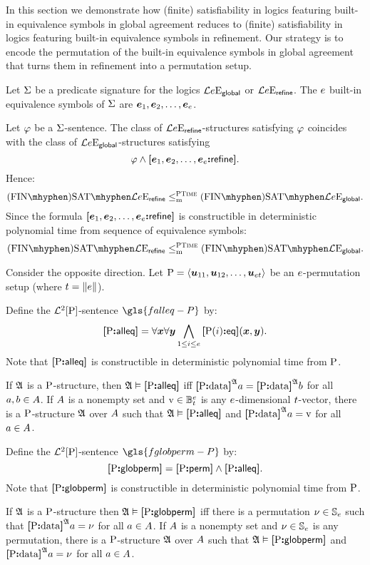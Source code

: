 
In this section we demonstrate how (finite) satisfiability in logics featuring
built-in equivalence symbols in global agreement reduces to (finite)
satisfiability in logics featuring built-in equivalence symbols in refinement.
Our strategy is to encode the permutation of the built-in equivalence symbols in
global agreement that turns them in refinement into a permutation setup.

Let $\mathrm{\Sigma}$ be a predicate signature for the logics $\mathcal{L}{e}\mathrm{E}_{\mathsf{global}}$
or $\mathcal{L}{e}\mathrm{E}_{\mathsf{refine}}$.
The $e$ built-in equivalence symbols of $\mathrm{\Sigma}$ are $\bm{e}_{1}, \bm{e}_{2}, \dots,
\bm{e}_{e}$.

Let $\varphi$ be a $\mathrm{\Sigma}$-sentence.
The class of $\mathcal{L}{e}\mathrm{E}_{\mathsf{refine}}$-structures satisfying $\varphi$
coincides with the class of $\mathcal{L}{e}\mathrm{E}_{\mathsf{global}}$-structures satisfying
\[
  \varphi \land {\bm{[}\bm{e}_{1},\bm{e}_{2},\dots,\bm{e}_{e}\mathord{\bm{:}}\mathsf{refine}\bm{]}}.
\]
Hence:
\[
  \FinASat{\Fo\Eea\sze\agrefine} \red\cP
  \FinASat{\Fo\Eea\sze\agglobal}.
\]
Since the formula ${\bm{[}\bm{e}_{1},\bm{e}_{2},\dots,\bm{e}_{e}\mathord{\bm{:}}\mathsf{refine}\bm{]}}$ is constructible in
deterministic polynomial time from sequence of equivalence symbols:
\[
  \FinASat{\Fo\Eea\nosze\agrefine} \red\cP
  \FinASat{\Fo\Eea\nosze\agglobal}.
\]

Consider the opposite direction.
Let ${\mathrm{P}} = \left\langle \bm{u}_{11}, \bm{u}_{12}, \dots, \bm{u}_{et} \right\rangle$ be an
$e$-permutation setup (where $t = \|e\|$).
\begin{definition}
Define the $\mathcal{L}^{2}[{\mathrm{P}}]$-sentence $\gls{falleq-P}$ by:
\[
  {\bm{[}{\mathrm{P}}\mathord{\bm{:}}\mathsf{alleq}\bm{]}} = \forall\bm{x} \forall\bm{y} \bigwedge_{1 \leq i \leq e}
  {\bm{[}{\mathrm{P}}(i)\mathord{\bm{:}}\mathsf{eq}\bm{]}}(\bm{x},\bm{y}).
\]
Note that ${\bm{[}{\mathrm{P}}\mathord{\bm{:}}\mathsf{alleq}\bm{]}}$ is constructible in deterministic polynomial time from
${\mathrm{P}}$.
\end{definition}
\begin{remark}
If $\mathfrak{A}$ is a ${\mathrm{P}}$-structure, then $\mathfrak{A} \vDash {\bm{[}{\mathrm{P}}\mathord{\bm{:}}\mathsf{alleq}\bm{]}}$ iff
${\bm{[}{\mathrm{P}}\mathord{\bm{:}}\mathrm{data}\bm{]}}^{\mathfrak{A}}a = {\bm{[}{\mathrm{P}}\mathord{\bm{:}}\mathrm{data}\bm{]}}^{\mathfrak{A}}b$ for all $a, b \in A$.
If $A$ is a nonempty set and $\mathrm{v} \in \mathbb{B}_{t}^{e}$ is any
$e$-dimensional $t$-vector, there is a ${\mathrm{P}}$-structure $\mathfrak{A}$ over
$A$ such that $\mathfrak{A} \vDash {\bm{[}{\mathrm{P}}\mathord{\bm{:}}\mathsf{alleq}\bm{]}}$ and
${\bm{[}{\mathrm{P}}\mathord{\bm{:}}\mathrm{data}\bm{]}}^{\mathfrak{A}}a = \mathrm{v}$ for all $a \in A$.
\end{remark}

\begin{definition}
Define the $\mathcal{L}^{2}[{\mathrm{P}}]$-sentence $\gls{fglobperm-P}$ by:
\[
  {\bm{[}{\mathrm{P}}\mathord{\bm{:}}\mathsf{globperm}\bm{]}} = {\bm{[}{\mathrm{P}}\mathord{\bm{:}}\mathsf{perm}\bm{]}} \land {\bm{[}{\mathrm{P}}\mathord{\bm{:}}\mathsf{alleq}\bm{]}}.
\]
Note that ${\bm{[}{\mathrm{P}}\mathord{\bm{:}}\mathsf{globperm}\bm{]}}$ is constructible in deterministic polynomial time
from ${\mathrm{P}}$.
\end{definition}
\begin{remark}
If $\mathfrak{A}$ is a ${\mathrm{P}}$-structure then $\mathfrak{A} \vDash {\bm{[}{\mathrm{P}}\mathord{\bm{:}}\mathsf{globperm}\bm{]}}$ iff there
is a permutation $\nu \in \mathbb{S}_{e}$ such that
${\bm{[}{\mathrm{P}}\mathord{\bm{:}}\mathrm{data}\bm{]}}^{\mathfrak{A}}a = \nu$ for all $a \in A$.
If $A$ is a nonempty set and $\nu \in \mathbb{S}_{e}$ is any permutation,
there is a ${\mathrm{P}}$-structure $\mathfrak{A}$ over $A$ such that
$\mathfrak{A} \vDash {\bm{[}{\mathrm{P}}\mathord{\bm{:}}\mathsf{globperm}\bm{]}}$ and ${\bm{[}{\mathrm{P}}\mathord{\bm{:}}\mathrm{data}\bm{]}}^{\mathfrak{A}}a = \nu$ for all 
$a \in A$.
\end{remark}

